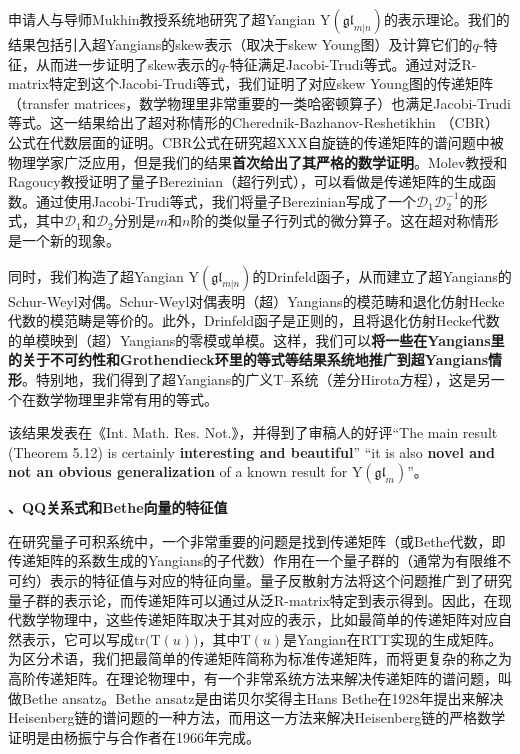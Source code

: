 \documentclass[12pt,UTF8,AutoFakeBold=4,a4paper]{ctexart}
\begin{document}
申请人与导师Mukhin教授系统地研究了超Yangian $\mathrm{Y}(\mathfrak{gl}_{m|n})$的表示理论。我们的结果包括引入超Yangians的skew表示（取决于skew Young图）及计算它们的$q$-特征，从而进一步证明了skew表示的$q$-特征满足Jacobi-Trudi等式。通过对泛R-matrix特定到这个Jacobi-Trudi等式，我们证明了对应skew Young图的传递矩阵（transfer matrices，数学物理里非常重要的一类哈密顿算子）也满足Jacobi-Trudi等式。这一结果给出了超对称情形的Cherednik-Bazhanov-Reshetikhin （CBR）公式在代数层面的证明。CBR公式在研究超XXX自旋链的传递矩阵的谱问题中被物理学家广泛应用，但是我们的结果\textbf{首次给出了其严格的数学证明}。Molev教授和Ragoucy教授证明了量子Berezinian（超行列式），可以看做是传递矩阵的生成函数。通过使用Jacobi-Trudi等式，我们将量子Berezinian写成了一个$\mathcal D_1\mathcal D_2^{-1}$的形式，其中$\mathcal D_1$和$\mathcal D_2$分别是$m$和$n$阶的类似量子行列式的微分算子。这在超对称情形是一个新的现象。

同时，我们构造了超Yangian $\mathrm{Y}(\mathfrak{gl}_{m|n})$的Drinfeld函子，从而建立了超Yangians的Schur-Weyl对偶。Schur-Weyl对偶表明（超）Yangians的模范畴和退化仿射Hecke代数的模范畴是等价的。此外，Drinfeld函子是正则的，且将退化仿射Hecke代数的单模映到（超）Yangians的零模或单模。这样，我们可以\textbf{将一些在Yangians里的关于不可约性和Grothendieck环里的等式等结果系统地推广到超Yangians情形}。特别地，我们得到了超Yangians的广义T--系统（差分Hirota方程），这是另一个在数学物理里非常有用的等式。

该结果发表在《Int. Math. Res. Not.》，并得到了审稿人的好评“The main result (Theorem 5.12) is certainly \textbf{interesting and
beautiful}” “it is also \textbf{novel and not an obvious generalization} of a known
result for $\mathrm{Y}(\mathfrak{gl}_m)$”。


\medskip

\textbf{、QQ关系式和Bethe向量的特征值}

在研究量子可积系统中，一个非常重要的问题是找到传递矩阵（或Bethe代数，即传递矩阵的系数生成的Yangians的子代数）作用在一个量子群的（通常为有限维不可约）表示的特征值与对应的特征向量。量子反散射方法将这个问题推广到了研究量子群的表示论，而传递矩阵可以通过从泛R-matrix特定到表示得到。因此，在现代数学物理中，这些传递矩阵取决于其对应的表示，比如最简单的传递矩阵对应自然表示，它可以写成$\mathrm{tr}\big(\mathrm T(u)\big)$，其中$\mathrm T(u)$是Yangian在RTT实现的生成矩阵。为区分术语，我们把最简单的传递矩阵简称为标准传递矩阵，而将更复杂的称之为高阶传递矩阵。在理论物理中，有一个非常系统方法来解决传递矩阵的谱问题，叫做Bethe ansatz。Bethe ansatz是由诺贝尔奖得主Hans Bethe在1928年提出来解决Heisenberg链的谱问题的一种方法，而用这一方法来解决Heisenberg链的严格数学证明是由杨振宁与合作者在1966年完成。
\end{document}
